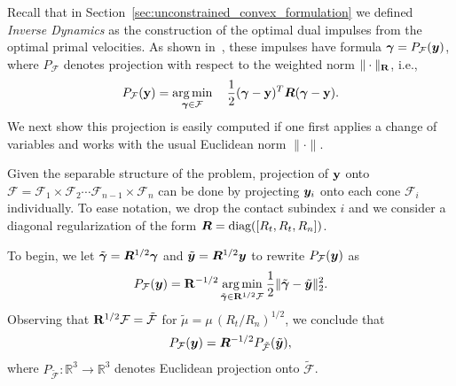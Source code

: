 Recall that in Section~\ref{sec:unconstrained_convex_formulation}
we defined \emph{Inverse Dynamics}
as the construction of the optimal dual impulses
from the optimal primal velocities.  As shown in~\cite{bib:todorov2014},
these impulses have formula ${\bm\gamma} = P_{\mathcal{F}}({\bm{y}})$, 
where $P_{\mathcal{F}}$ denotes projection
with respect to the weighted norm $\|\cdot\|_{{\mathbf{R}}}$, i.e.,
\[
P_{\mathcal{F}}({\mathbf{y}}) = \operatorname*{arg\,min}_{{\bm\gamma}\in\mathcal{F}} \quad \frac{1}{2}({\bm\gamma}-{\mathbf{y}})^T{\bm{R}}({\bm\gamma}-{\mathbf{y}}).
\]
We next show this projection is easily computed
if one first applies a change of variables and works with the usual Euclidean norm $\|\cdot\|$.

Given the separable structure of the problem, projection of ${\mathbf{y}}$ onto $\mathcal{F} =
\mathcal{F}_{1} \times \mathcal{F}_{2} \cdots
\mathcal{F}_{{n-1}}\times\mathcal{F}_{n}$ can be done by projecting ${\bm{y}}_i$ onto each
cone $\mathcal{F}_{i}$ individually. To ease notation, we drop the contact subindex $i$ and we consider a diagonal regularization of the form ${\bm{R}} = \text{diag}([R_t, R_t, R_n])$.

To begin, we let $\tilde{{\bm\gamma}}={\bm{R}}^{1/2}{\bm\gamma}$ and
$\tilde{{\bm{y}}}={\bm{R}}^{1/2}{\bm{y}}$ to rewrite $P_{\mathcal{F}}({\bm{y}})$ as
\[
  P_{\mathcal{F}}({\bm{y}}) = {\mathbf{R}}^{-1/2} \operatorname*{arg\,min}_{\tilde {{\bm\gamma}}\in {\mathbf{R}}^{1/2} \mathcal{F}} \frac{1}{2}\Vert\tilde{{\bm\gamma}}-\tilde{{\bm{y}}} \Vert_2^2.
\]                                                                               
Observing that ${\mathbf{R}}^{1/2} \mathcal{F} = \tilde{\mathcal{F}}$ for $\tilde \mu =\mu\,(R_t/R_n)^{1/2}$,
we conclude that
\begin{eqnarray*}
  P_\mathcal{F}({\bm{y}})={\bm{R}}^{-1/2} P_{\tilde{\mathcal{F}}}(\tilde{{\bm{y}}}),
\end{eqnarray*}
where $P_{\tilde{\mathcal{F}}} : \mathbb{R}^3 \rightarrow \mathbb{R}^3$ denotes Euclidean projection onto $\tilde{\mathcal{F}}$.


